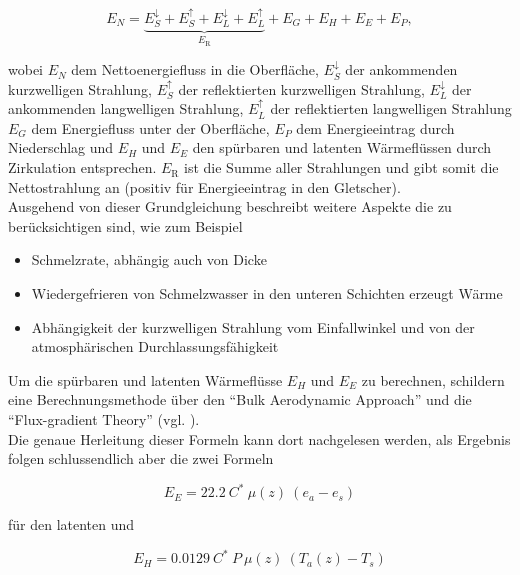\documentclass[12pt,a4paper]{article}
\begin{document}
\begin{equation}
E_{N}=\underbrace{E_{S}^{\downarrow}+E_{S}^{\uparrow}+E_{L}^{\downarrow}+E_{L}^{\uparrow}}_{E_{\mathrm{R}}}+E_{G}+E_{H}+E_{E}+E_{P},
\end{equation}

wobei $E_{N}$ dem Nettoenergiefluss in die Oberfläche, $E_{S}^{\downarrow}$ der ankommenden kurzwelligen Strahlung, $E_{S}^{\uparrow}$ der reflektierten kurzwelligen Strahlung, $E_{L}^{\downarrow}$ der ankommenden langwelligen Strahlung, $E_{L}^{\uparrow}$ der reflektierten langwelligen Strahlung $E_{G}$ dem Energiefluss unter der Oberfläche, $E_{P}$ dem Energieeintrag durch Niederschlag und $E_{H}$ und $E_{E}$ den spürbaren und latenten Wärmeflüssen durch Zirkulation entsprechen. $E_{\mathrm{R}}$ ist die Summe aller Strahlungen und gibt somit die Nettostrahlung an (positiv für Energieeintrag in den Gletscher).\\

Ausgehend von dieser Grundgleichung beschreibt \citeauthor{ThePhysicsOfGlaciers} weitere Aspekte die zu berücksichtigen sind, wie zum Beispiel 

\begin{itemize}
\item{Schmelzrate, abhängig auch von Dicke }
\item{Wiedergefrieren von Schmelzwasser in den unteren Schichten erzeugt Wärme}
\item{Abhängigkeit der kurzwelligen Strahlung vom Einfallwinkel und von der atmosphärischen Durchlassungsfähigkeit}
\end{itemize}

Um die spürbaren und latenten Wärmeflüsse $E_{H}$ und $E_{E}$ zu berechnen, schildern \citeauthor{ThePhysicsOfGlaciers} eine Berechnungsmethode über den ``Bulk Aerodynamic Approach'' und die ``Flux-gradient Theory'' (vgl. \cite[153-157]{ThePhysicsOfGlaciers}).\\
Die genaue Herleitung dieser Formeln kann dort nachgelesen werden, als Ergebnis folgen schlussendlich aber die zwei Formeln

\begin{equation}\label{eq:Berechnung latenter Energiefluss}
E_{E}= 22.2~C^*~\mu(z)~(e_a-e_s)
\end{equation}

für den latenten und

\begin{equation}\label{eq:Berechnung sensibler Energiefluss}
E_{H}= 0.0129~C^*~P~\mu(z)~(T_a(z)-T_s)
\end{equation}
\end{document}
